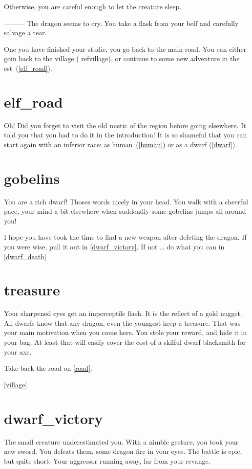 Otherwise, you are careful enough to let the creature sleep.

---------
The dragon seems to cry. You take a flask from your belf and carefully salvage a
tear.

One you have finished your studie, you go back to the main road. You can either
goin back to the village ( ref{village}), or continue to some new adventure in
the est~(\ref{elf_road}).

\section{elf_road}

Oh! Did you forget to visit the old mistic of the region before going elsewhere.
It told you that you had to do it in the introduction! It is so shameful that
you can start again with an inferior race: as human~(\ref{human}) or as a dwarf
(\ref{dwarf}).

\section{gobelins}

You are a rich dwarf! Thoses words nicely in your head. You walk with a cheerful
pace, your mind a bit elsewhere when suddendly some gobelins jumps all around
you!

I hope you have took the time to find a new weapon after defeting the dragon. If
you were wise, pull it out in \ref{dwarf_victory}. If not … do what you can in
\ref{dwarf_death}

\section{treasure}

Your sharpened eyes get an imperceptile flash. It is the reflect of a gold
nugget. All dwarfs know that any dragon, even the youngest keep a treasure. That
was your main motivation when you come here. You stole your reward, and hide it
in your bag. At least that will easily cover the cost of a skilful dwarf
blacksmith for your axe.

Take back the road on \ref{road}.

\ref{village}

\section{dwarf_victory}

The small creature underestimated you. With a nimble gesture, you took your new
sword. You defeats them, some dragon fire in your eyes. The battle is epic, but
quite short. Your aggressor running away, far from your revange.

